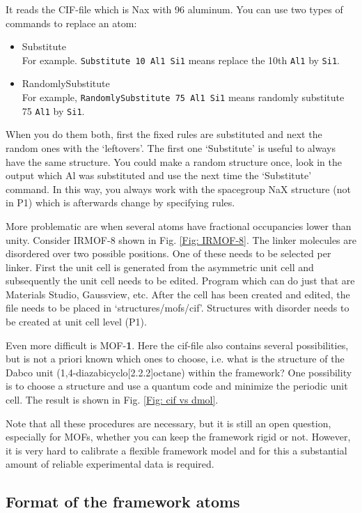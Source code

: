 It reads the CIF-file which is Nax with 96 aluminum. You can use two types of commands to replace an atom:
\begin{itemize}
\item{Substitute}\\
For example. \verb=Substitute 10 Al1 Si1= means replace the 10th \verb=Al1= by \verb=Si1=.
\item{RandomlySubstitute}\\
For example, \verb=RandomlySubstitute 75 Al1 Si1= means randomly substitute 75 \verb=Al1= by \verb=Si1=.
\end{itemize}

When you do them both, first the fixed rules are substituted and next the random ones with the `leftovers'.
The first one `Substitute' is useful to always have the same structure. You could make a random structure once, look in the output which Al was substituted and use the next time the `Substitute' command.
In this way, you always work with the spacegroup NaX structure (not in P1) which is afterwards change by specifying rules.

More problematic are when several atoms have fractional occupancies lower than unity. Consider IRMOF-8 shown in Fig. \ref{Fig: IRMOF-8}.
The linker molecules are disordered over two possible positions. One of these needs to be selected per linker. First the unit cell
is generated from the asymmetric unit cell and subsequently the unit cell needs to be edited. Program which can do just that are
Materials Studio, Gaussview, etc. After the cell has been created and edited, the file needs to be placed
in `structures/mofs/cif'. Structures with disorder needs to be created at unit cell level (P1).

Even more difficult is MOF-{\bf 1}. Here the cif-file also contains several possibilities, but is not a priori known which ones to choose, i.e.
what is the structure of the Dabco unit (1,4-diazabicyclo[2.2.2]octane) within the framework? One possibility is to choose a structure
and use a quantum code and minimize the periodic unit cell. The result is shown in Fig. \ref{Fig: cif vs dmol}.

Note that all these procedures are necessary, but it is still an open question, especially for MOFs, whether you can keep the framework rigid or not.
However, it is very hard to calibrate a flexible framework model and for this a substantial amount of reliable experimental data is required.

\subsection{Format of the framework atoms}

